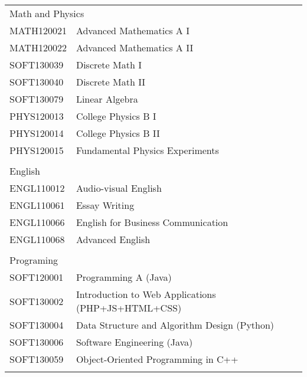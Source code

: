 \begin{table}[]
\begin{tabular}{lll}
\multicolumn{2}{l}{Math and Physics}                              &  \\
MATH120021   & Advanced Mathematics A I                           &  \\
MATH120022   & Advanced Mathematics A II                          &  \\
SOFT130039   & Discrete Math I                                    &  \\
SOFT130040   & Discrete Math II                                   &  \\
SOFT130079   & Linear Algebra                                     &  \\
PHYS120013   & College Physics B I                                &  \\
PHYS120014   & College Physics B II                               &  \\
PHYS120015   & Fundamental Physics Experiments                    &  \\
             &                                                    &  \\
\multicolumn{2}{l}{English}                                       &  \\
ENGL110012   & Audio-visual English                               &  \\
ENGL110061   & Essay Writing                                      &  \\
ENGL110066   & English for Business Communication                 &  \\
ENGL110068   & Advanced English                                   &  \\
             &                                                    &  \\
\multicolumn{2}{l}{Programing}                                    &  \\
SOFT120001   & Programming A (Java)                               &  \\
SOFT130002   & Introduction to Web Applications (PHP+JS+HTML+CSS) &  \\
SOFT130004   & Data Structure and Algorithm Design (Python)       &  \\
SOFT130006   & Software Engineering (Java)                        &  \\
SOFT130059   & Object-Oriented Programming in C++                 &  \\
             &                                                    &  \\

\end{tabular}
\end{table}
